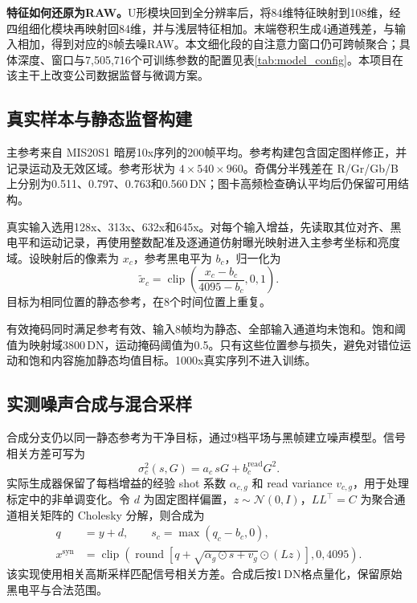 \documentclass[11pt,a4paper,UTF8,fontset=fandol]{ctexart}
\newcommand{\dn}{\ensuremath{\,\mathrm{DN}}}
\begin{document}
\textbf{特征如何还原为RAW。}U形模块回到全分辨率后，将84维特征映射到108维，经四组细化模块再映射回84维，并与浅层特征相加。末端卷积生成4通道残差，与输入相加，得到对应的8帧去噪RAW。本文细化段的自注意力窗口仍可跨帧聚合；具体深度、窗口与7,505,716个可训练参数的配置见表\ref{tab:model_config}。本项目在该主干上改变公司数据监督与微调方案。

\subsection{真实样本与静态监督构建}

主参考来自 MIS20S1 暗房10x序列的200帧平均。参考构建包含固定图样修正，并记录运动及无效区域。参考形状为 $4\times540\times960$。奇偶分半残差在 R/Gr/Gb/B 上分别为0.511、0.797、0.763和0.560\dn；图卡高频检查确认平均后仍保留可用结构。

真实输入选用128x、313x、632x和645x。对每个输入增益，先读取其位对齐、黑电平和运动记录，再使用整数配准及逐通道仿射曝光映射进入主参考坐标和亮度域。设映射后的像素为 $x_c$，参考黑电平为 $b_c$，归一化为
\begin{equation}
 \widetilde{x}_c=\operatorname{clip}\left(\frac{x_c-b_c}{4095-b_c},0,1\right).
 \label{eq:normalization}
\end{equation}
目标为相同位置的静态参考，在8个时间位置上重复。

有效掩码同时满足参考有效、输入8帧均为静态、全部输入通道均未饱和。饱和阈值为映射域3800\dn，运动掩码阈值为0.5。只有这些位置参与损失，避免对错位运动和饱和内容施加静态均值目标。1000x真实序列不进入训练。

\subsection{实测噪声合成与混合采样}

合成分支仍以同一静态参考为干净目标，通过9档平场与黑帧建立噪声模型。信号相关方差可写为
\begin{equation}
 \sigma_c^2(s,G)=a_c\,sG+b_c^{\mathrm{read}}G^2.
\end{equation}
实际生成器保留了每档增益的经验 shot 系数 $\alpha_{c,g}$ 和 read variance $v_{c,g}$，用于处理标定中的非单调变化。令 $d$ 为固定图样偏置，$z\sim\mathcal N(0,I)$，$LL^\top=C$ 为聚合通道相关矩阵的 Cholesky 分解，则合成为
\begin{align}
 q &= y+d,\qquad s_c=\max(q_c-b_c,0),\\
 x^{\mathrm{syn}} &= \operatorname{clip}\left(
 \operatorname{round}\left[q+\sqrt{\alpha_g\odot s+v_g}\odot(Lz)\right],0,4095\right).
 \label{eq:synthetic}
\end{align}
该实现使用相关高斯采样匹配信号相关方差。合成后按1\dn{}格点量化，保留原始黑电平与合法范围。
\end{document}
